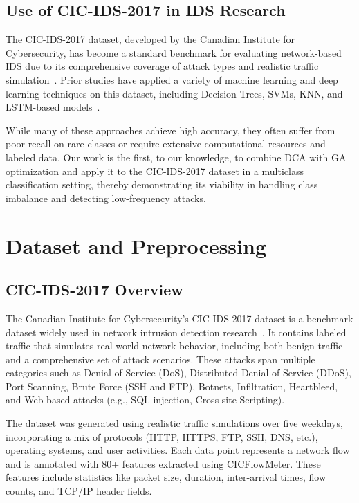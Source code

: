 \documentclass[conference]{IEEEtran}
\begin{document}
\subsection{Use of CIC-IDS-2017 in IDS Research}

The CIC-IDS-2017 dataset, developed by the Canadian Institute for
Cybersecurity, has become a standard benchmark for evaluating
network-based IDS due to its comprehensive coverage of attack types
and realistic traffic simulation~\cite{khan_comprehensive_2024}.
Prior studies have applied a
variety of machine learning and deep learning techniques on this
dataset, including Decision Trees, SVMs, KNN, and LSTM-based
models~\cite{ustebay2018intrusion,panigrahi2018detailed}.

While many of these approaches achieve high accuracy, they often
suffer from poor recall on rare classes or require extensive
computational resources and labeled data. Our work is the first, to
our knowledge, to combine DCA with GA optimization and apply it to
the CIC-IDS-2017 dataset in a multiclass classification setting,
thereby demonstrating its viability in handling class imbalance and
detecting low-frequency attacks.

\section{Dataset and Preprocessing}

\subsection{CIC-IDS-2017 Overview}

The Canadian Institute for Cybersecurity's CIC-IDS-2017 dataset is a
benchmark dataset widely used in network intrusion detection
research~\cite{sharafaldin_toward_2018}. It contains labeled traffic
that simulates real-world
network behavior, including both benign traffic and a comprehensive
set of attack scenarios. These attacks span multiple categories such
as Denial-of-Service (DoS), Distributed Denial-of-Service (DDoS),
Port Scanning, Brute Force (SSH and FTP), Botnets, Infiltration,
Heartbleed, and Web-based attacks (e.g., SQL injection, Cross-site Scripting).

The dataset was generated using realistic traffic simulations over
five weekdays, incorporating a mix of protocols (HTTP, HTTPS, FTP,
SSH, DNS, etc.), operating systems, and user activities. Each data
point represents a network flow and is annotated with 80+ features
extracted using CICFlowMeter. These features include statistics like
packet size, duration, inter-arrival times, flow counts, and TCP/IP
header fields.
\end{document}
